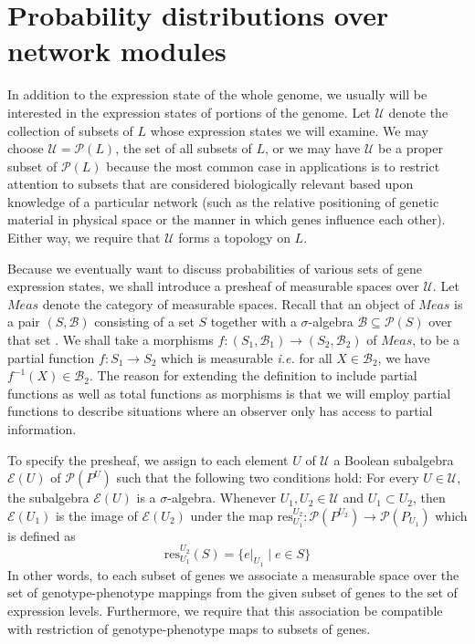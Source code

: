 \section{Probability distributions over network modules}

In addition to the expression state of the whole genome, we usually will be interested in the expression states of portions of the genome.  Let $\mathcal{U}$ denote the collection of subsets of $L$ whose expression states we will examine.  We may choose $\mathcal{U} = \mathcal{P}(L)$, the set of all subsets of $L$, or we may have $\mathcal{U}$ be a proper subset of $\mathcal{P}(L)$ because the most common case in applications is to restrict attention to subsets that are considered biologically relevant based upon knowledge of a particular network (such as the relative positioning of genetic material in physical space or the manner in which genes influence each other).  Either way, we require that $\mathcal{U}$ forms a topology on $L$.

Because we eventually want to discuss probabilities of various sets of gene expression states, we shall introduce a presheaf of measurable spaces over $\mathcal{U}$.  Let $\mathit{Meas}$ denote the category of measurable spaces. Recall that an object of $Meas$ is a pair $(S,\mathcal{B})$ consisting of a set $S$ together with a $\sigma$-algebra $\mathcal{B} \subseteq \mathcal{P}(S)$ over that set \cite{Ash1999}.  We shall take a morphisms $f \colon (S_1,\mathcal{B}_1) \to (S_2,\mathcal{B}_2)$ of $\mathit{Meas}$, to be a partial function $f \colon S_1 \to S_2$ which is measurable \emph{i.e.} for all $X \in \mathcal{B}_2$, we have $f^{-1} (X) \in \mathcal{B}_2$.  The reason for extending the definition to include partial functions as well as total functions as morphisms is that we will employ partial functions to describe situations where an observer only has access to partial information.

To specify the presheaf, we assign to each element $U$ of $\mathcal{U}$ a Boolean subalgebra $\mathcal{E}(U)$ of $\mathcal{P}({P^U})$ such that the following two conditions hold:  For every $U \in \mathcal{U}$, the subalgebra $\mathcal{E}(U)$ is a $\sigma$-algebra.  Whenever $U_1, U_2 \in \mathcal{U}$ and $U_1 \subset U_2$, then $\mathcal{E}(U_1)$ is the image of $\mathcal{E}(U_2)$ under the map $\mathrm{res}^{U_2}_{U_1} \colon \mathcal{P}(P^{U_2}) \to \mathcal{P}(P_{U_1})$ which is defined as
\[
 \mathrm{res}^{U_2}_{U_1} (S) =
 \{ e|_{U_1} \mid e \in S\}
\]
In other words, to each subset of genes we associate a measurable space over the set of genotype-phenotype mappings from the given subset of genes to the set of expression levels.  Furthermore, we require that this association be compatible with restriction of genotype-phenotype maps to subsets of genes.

